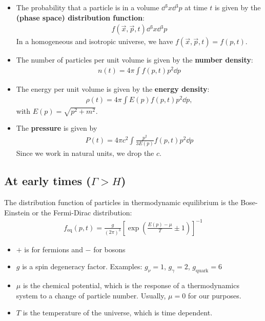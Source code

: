 \begin{itemize}
	\item The probability that a particle is in a volume $\dd{^3 x} \dd{^3 p}$  at time $t$ is given by the \textbf{(phase space) distribution function}:
	\begin{align*}
		f(\vec{x}, \vec{p}, t) \dd{^3 x} \dd{^3 p}
	\end{align*}
	In a homogeneous and isotropic universe, we have $f(\vec{x}, \vec{p}, t) = f(p, t)$.
	\item The number of particles per unit volume is given by the \textbf{number density}:
	\begin{align*}
		n(t) = 4\pi \int f(p,t) p^2  \dd{p}
	\end{align*}
	\item The energy per unit volume is given by the \textbf{energy density}:
	\begin{align*}
		\rho(t) = 4 \pi \int E(p) f(p,t) p^2 \dd{p},
	\end{align*}
	with $E(p) = \sqrt{p^2 + m^2}$.
	\item The \textbf{pressure} is given by
	\begin{align*}
		P(t) = 4 \pi c^2 \int \frac{p^2}{3 E(p)} f(p,t) p^2 \dd{p}
	\end{align*}
	Since we work in natural units, we drop the $c$.
\end{itemize}


\subsection{At early times ($\Gamma > H$)}
\label{ssec:early-times}
The distribution function of particles in thermodynamic equilibrium is the Bose-Einstein or the Fermi-Dirac distribution:
\begin{align*}
	f_\text{eq}(p,t)
	= \frac{g}{(2\pi)^3} \left[ \exp\left( 
		\frac{E(p)-\mu}{T} \pm 1
	 \right) \right]^{-1}
\end{align*}
\begin{itemize}
	\item $+$ is for fermions and $-$ for bosons
	\item $g$ is a spin degeneracy factor. Examples: $g_\nu = 1$, $g_\gamma = 2$, $g_\text{quark} = 6$
	\item $\mu$ is the chemical potential, which is the response of a thermodynamics system to a change of particle number. Usually, $\mu=0$ for our purposes.
	\item $T$ is the temperature of the universe, which is time dependent.
\end{itemize}

